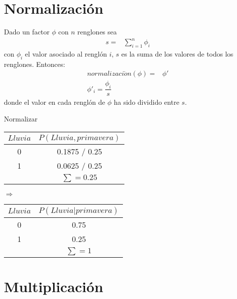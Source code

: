 \section{Normalización}

\begin{definition}[Normalización]
Dado un factor $\phi$ con $n$ renglones sea
\begin{align}
 s =& \sum_{i=1}^n \phi_i
\end{align}
con $\phi_i$ el valor asociado al renglón $i$, $s$ es la suma de los valores de todos los renglones.  Entonces:
\begin{align}
 normalizaci\acute{o}n(\phi) =& \phi' \\
 \phi'_i = \dfrac{\phi_i}{s}
\end{align}
donde el valor en cada renglón de $\phi$ ha sido dividido entre $s$.
\end{definition}

\begin{example}{Normalizar}
\begin{center}
\begin{tabular}{c|c}
 $Lluvia$ & $P(Lluvia,primavera)$ \\ \toprule
 0 & 0.1875 / 0.25 \\
 1 & 0.0625 / 0.25 \\
 \multicolumn{1}{c}{}  & $\sum=0.25$
\end{tabular}$\Rightarrow$
\begin{tabular}{c|c}
 $Lluvia$ & $P(Lluvia|primavera)$ \\ \toprule
 0 & 0.75 \\
 1 & 0.25 \\
 \multicolumn{1}{c}{}  & $\sum=1$
\end{tabular}
\end{center}
\end{example}


\section{Multiplicación}

